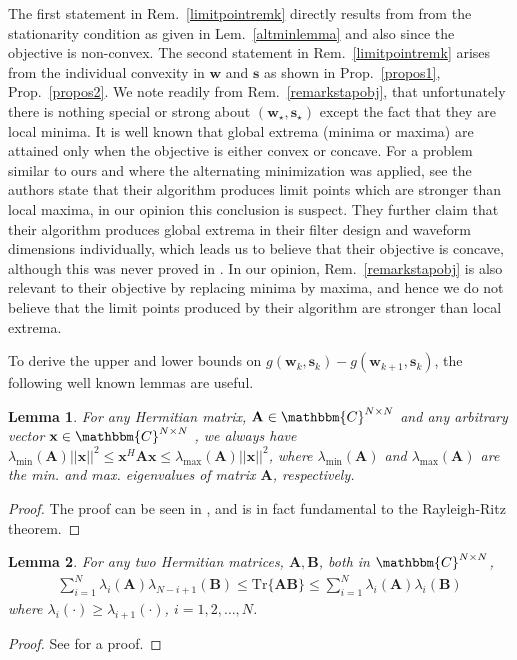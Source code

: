 \documentclass[11pt,draftclsnofoot,onecolumn]{IEEEtran}
\newtheorem{lem}{\bf {Lemma}}
\theoremstyle{definition}
\theoremstyle{remark}
\begin{document}
The first statement in Rem.~\ref{limitpointremk} directly results from  from the stationarity condition as  given  in Lem.~\ref{altminlemma} and also since the objective is non-convex. The second statement in Rem.~\ref{limitpointremk} arises from the individual convexity in $\mathbf{w}$ and $\mathbf{s}$ as shown in Prop.~\ref{propos1}, Prop.~\ref{propos2}. We note readily from Rem.~\ref{remarkstapobj}, that unfortunately there is nothing special or strong about $(\mathbf{w}_\star,\mathbf{s}_\star)$ except the fact that they are local minima. It is well known that global extrema (minima or maxima) are attained only when the objective is either convex or concave. For a problem similar to ours and where the alternating minimization was applied, see \cite[pg.3537]{vaidyanathan2009} the authors state that their algorithm produces limit points which are stronger than local maxima, in our opinion this conclusion is suspect. They further claim that their algorithm produces global extrema in their filter design and waveform dimensions individually, which leads us to believe that their objective is concave, although this was never proved in \cite{vaidyanathan2009}. In our opinion, Rem.~\ref{remarkstapobj} is also relevant to their objective by replacing minima by maxima, and hence  we do not believe that the limit points produced by their algorithm are stronger than local extrema. 

To derive the upper and lower bounds on $g(\mathbf{w}_k,\mathbf{s}_k)-g(\mathbf{w}_{k+1},\mathbf{s}_k)$, the following well known lemmas are useful.
\begin{lem}\label{lemma2}
For any Hermitian matrix, $\mathbf{A}\in\mathbbm{C}^{N\times N}$ and any arbitrary vector $\mathbf{x}\in\mathbbm{C}^{N\times N}$ , we always have $\lambda_{\min}(\mathbf{A})||\mathbf{x}||^2\leq \mathbf{x}^H\mathbf{Ax}\leq\lambda_{\max}(\mathbf{A})||\mathbf{x}||^2$, where $\lambda_{\min}(\mathbf{A})$ and $\lambda_{\max}(\mathbf{A})$ are the min. and max. eigenvalues of matrix $\mathbf{A}$, respectively.
\end{lem}
\begin{proof}
The proof can be seen in \cite{horn1994}, and is in fact fundamental to the Rayleigh-Ritz theorem.
\end{proof}
\begin{lem}\label{lemma3}
For any two Hermitian matrices, $\mathbf{A,B}$, both in $\mathbbm{C}^{N\times N}$,
\begin{align*}
\sum\limits_{i=1}^N \lambda_i(\mathbf{A}) \lambda_{N-i+1}(\mathbf{B})\leq \mathrm{Tr}\{ \mathbf{AB}\}\leq\sum\limits_{i=1}^N \lambda_i(\mathbf{A})\lambda_i(\mathbf{B})
\end{align*}
where $\lambda_i(\cdot)\geq \lambda_{i+1}(\cdot)$, $i=1,2,\ldots,N$.
\end{lem}
\begin{proof}
See \cite[Lemma. II. I]{Lasserre1995} for a proof.
\end{proof}
\end{document}
